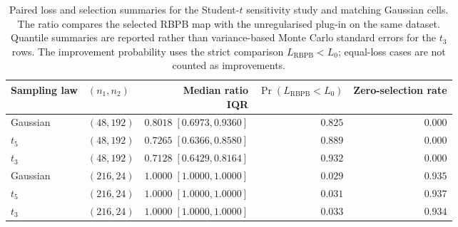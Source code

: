 \begin{table}[htbp]
\centering
\small
\setlength{\tabcolsep}{5pt}
\begin{tabular}{@{}llrrr@{}}
\toprule
Sampling law & $(n_1,n_2)$ & \shortstack{Median ratio\\IQR} &
$\Pr(L_{\mathrm{RBPB}}<L_0)$ & Zero-selection rate \\
\midrule
Gaussian & $(48,192)$ & $0.8018\;[0.6973,0.9360]$ & $0.825$ & $0.000$ \\
$t_5$ & $(48,192)$ & $0.7265\;[0.6366,0.8580]$ & $0.889$ & $0.000$ \\
$t_3$ & $(48,192)$ & $0.7128\;[0.6429,0.8164]$ & $0.932$ & $0.000$ \\
\addlinespace
Gaussian & $(216,24)$ & $1.0000\;[1.0000,1.0000]$ & $0.029$ & $0.935$ \\
$t_5$ & $(216,24)$ & $1.0000\;[1.0000,1.0000]$ & $0.031$ & $0.937$ \\
$t_3$ & $(216,24)$ & $1.0000\;[1.0000,1.0000]$ & $0.033$ & $0.934$ \\
\bottomrule
\end{tabular}
\caption{Paired loss and selection summaries for the Student-$t$ sensitivity
study and matching Gaussian cells. The ratio compares the selected RBPB map
with the unregularised plug-in on the same dataset. Quantile summaries are
reported rather than variance-based Monte Carlo standard errors for the
$t_3$ rows. The improvement probability uses the strict comparison
$L_{\mathrm{RBPB}}<L_0$; equal-loss cases are not counted as improvements.}
\label{tab:supp-student-t-sensitivity}
\end{table}
